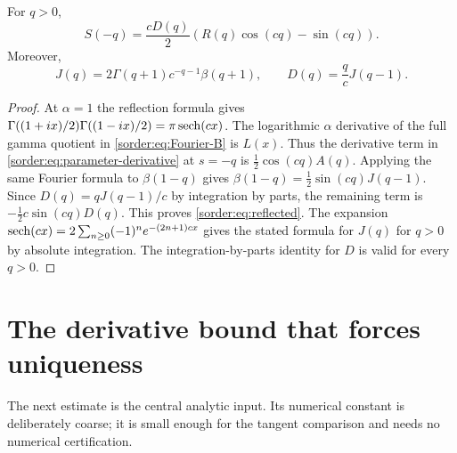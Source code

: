 \begin{proposition}\label{sorder:prop:reflected}
For $q>0$,
\begin{equation}\label{sorder:eq:reflected}
 S(-q)=\frac{cD(q)}2
       \left(R(q)\cos(cq)-\sin(cq)\right).
\end{equation}
Moreover,
\begin{equation}\label{sorder:eq:moments}
 J(q)=2\Gamma(q+1)c^{-q-1}\beta(q+1),\qquad
 D(q)=\frac q c J(q-1).
\end{equation}
\end{proposition}
\begin{proof}
At $\alpha=1$ the reflection formula gives
$\Gamma((1+ix)/2)\Gamma((1-ix)/2)=\pi\operatorname{sech}(cx)$.
The logarithmic $\alpha$ derivative of the full gamma quotient in
\eqref{sorder:eq:Fourier-B} is $L(x)$.
Thus the derivative term in \eqref{sorder:eq:parameter-derivative}
at $s=-q$ is $\tfrac12\cos(cq)A(q)$.
Applying the same Fourier formula to $\beta(1-q)$ gives
$\beta(1-q)=\tfrac12\sin(cq)J(q-1)$.
Since $D(q)=qJ(q-1)/c$ by integration by parts, the remaining term is
$-\tfrac12 c\sin(cq)D(q)$. This proves \eqref{sorder:eq:reflected}.
The expansion $\operatorname{sech}(cx)=2\sum_{n\ge0}(-1)^ne^{-(2n+1)cx}$
gives the stated formula for $J(q)$ for $q>0$ by absolute integration.
The integration-by-parts identity for $D$ is valid for every $q>0$.
\end{proof}

\section{The derivative bound that forces uniqueness}

The next estimate is the central analytic input. Its numerical constant
is deliberately coarse; it is small enough for the tangent comparison
and needs no numerical certification.

